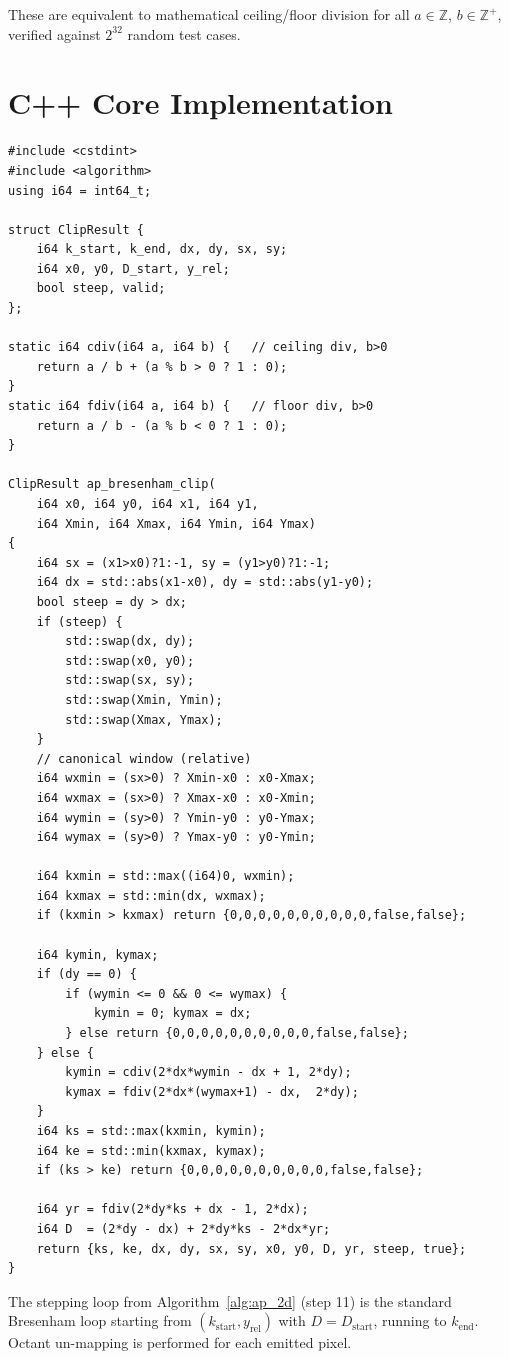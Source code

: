 \documentclass[12pt,a4paper]{article}
\theoremstyle{definition}
\newcommand{\Z}{\mathbb{Z}}
\begin{document}
These are equivalent to mathematical ceiling/floor division
for all $a \in \Z$, $b \in \Z^+$, verified against
$2^{32}$ random test cases.

\renewcommand{\thesection}{B}
\section{C++ Core Implementation}
\label{app:cpp}

\begin{lstlisting}[caption={AP-Bresenham 2D clip setup in C++17}]
#include <cstdint>
#include <algorithm>
using i64 = int64_t;

struct ClipResult {
    i64 k_start, k_end, dx, dy, sx, sy;
    i64 x0, y0, D_start, y_rel;
    bool steep, valid;
};

static i64 cdiv(i64 a, i64 b) {   // ceiling div, b>0
    return a / b + (a % b > 0 ? 1 : 0);
}
static i64 fdiv(i64 a, i64 b) {   // floor div, b>0
    return a / b - (a % b < 0 ? 1 : 0);
}

ClipResult ap_bresenham_clip(
    i64 x0, i64 y0, i64 x1, i64 y1,
    i64 Xmin, i64 Xmax, i64 Ymin, i64 Ymax)
{
    i64 sx = (x1>x0)?1:-1, sy = (y1>y0)?1:-1;
    i64 dx = std::abs(x1-x0), dy = std::abs(y1-y0);
    bool steep = dy > dx;
    if (steep) {
        std::swap(dx, dy);
        std::swap(x0, y0);
        std::swap(sx, sy);
        std::swap(Xmin, Ymin);
        std::swap(Xmax, Ymax);
    }
    // canonical window (relative)
    i64 wxmin = (sx>0) ? Xmin-x0 : x0-Xmax;
    i64 wxmax = (sx>0) ? Xmax-x0 : x0-Xmin;
    i64 wymin = (sy>0) ? Ymin-y0 : y0-Ymax;
    i64 wymax = (sy>0) ? Ymax-y0 : y0-Ymin;

    i64 kxmin = std::max((i64)0, wxmin);
    i64 kxmax = std::min(dx, wxmax);
    if (kxmin > kxmax) return {0,0,0,0,0,0,0,0,0,0,false,false};

    i64 kymin, kymax;
    if (dy == 0) {
        if (wymin <= 0 && 0 <= wymax) {
            kymin = 0; kymax = dx;
        } else return {0,0,0,0,0,0,0,0,0,0,false,false};
    } else {
        kymin = cdiv(2*dx*wymin - dx + 1, 2*dy);
        kymax = fdiv(2*dx*(wymax+1) - dx,  2*dy);
    }
    i64 ks = std::max(kxmin, kymin);
    i64 ke = std::min(kxmax, kymax);
    if (ks > ke) return {0,0,0,0,0,0,0,0,0,0,false,false};

    i64 yr = fdiv(2*dy*ks + dx - 1, 2*dx);
    i64 D  = (2*dy - dx) + 2*dy*ks - 2*dx*yr;
    return {ks, ke, dx, dy, sx, sy, x0, y0, D, yr, steep, true};
}
\end{lstlisting}

The stepping loop from Algorithm~\ref{alg:ap_2d} (step 11)
is the standard Bresenham loop starting from
$(k_{\mathrm{start}}, y_{\mathrm{rel}})$ with
$D = D_{\mathrm{start}}$, running to $k_{\mathrm{end}}$.
Octant un-mapping is performed for each emitted pixel.



\end{document}
